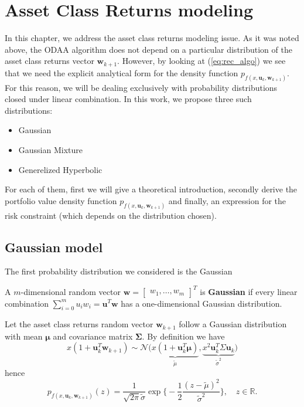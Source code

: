 \chapter{Asset Class Returns modeling}\label{chpt:assetclass_returns}
	
In this chapter, we address the asset class returns modeling issue. As it was noted above, the ODAA algorithm does not depend on a particular distribution of the asset class returns vector $\bm{w}_{k+1}$. However, by looking at (\ref{eq:rec_algo}) we see that we need the explicit analytical form for the density function $p_{f(x,\bm{u}_k,\bm{w}_{k+1})}$. For this reason, we will be dealing exclusively with probability distributions closed under linear combination. In this work, we propose three such distributions:
\begin{itemize}
	\item Gaussian
	\item Gaussian Mixture
	\item Generelized Hyperbolic
\end{itemize}
For each of them, first we will give a theoretical introduction, secondly derive the portfolio value density function $p_{f(x,\bm{u}_k,\bm{w}_{k+1})}$ and finally, an expression for the risk constraint (which depends on the distribution chosen).
\section{Gaussian model}
The first probability distribution we considered is the Gaussian 
\begin{definition}\label{def:gauss_rv}
	A $m$-dimensional random vector $\bm{w} = \begin{bmatrix}w_1,\ldots,w_m\end{bmatrix}^T$ is \textbf{Gaussian} if every linear combination $\sum_{i=0}^{m}u_iw_i = \bm{u}^T \bm{w}$ has a one-dimensional Gaussian distribution.
\end{definition}
Let the asset class returns random vector $\bm{w}_{k+1}$ follow a Gaussian distribution with mean $\bm{\mu}$ and covariance matrix $\bm{\Sigma}$. By definition we have \[x(1 + \bm{u}_k^T \bm{w}_{k+1}) \sim \mathcal{N}\Big(\underbrace{x(1 + \bm{u}_k^T \bm{\mu})}_{\tilde{\mu}}, \underbrace{x^2\bm{u}_k^T \Sigma \bm{u}_k}_{\tilde{\sigma}^2}\Big)\]
hence
\begin{equation}
\boxed{p_{f(x,\bm{u}_k,\bm{w}_{k+1})}(z) =  \frac{1}{\sqrt{2\pi}\tilde{\sigma}}\exp\bigg\{ -\frac{1}{2}\frac{(z-\tilde{\mu})^2}{\tilde{\sigma}^2}\bigg\}, \quad z \in \mathbb{R}.}
\end{equation}
 

